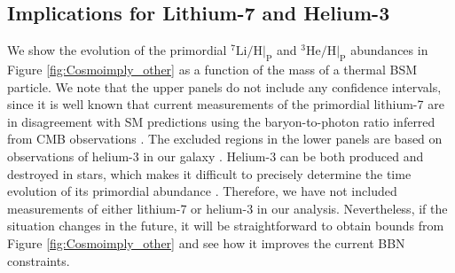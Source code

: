 \documentclass[notitlepage,letterpaper,natbib,aps,prd,onecolumn,amsmath,amsfonts,nofootinbib,preprintnumbers,superscriptaddress,secnumarabic,groupedaddress]{revtex4-1}
\begin{document}
\cleardoublepage

\cleardoublepage

\subsection{Implications for Lithium-7 and Helium-3}
\label{app:cosmo_imp_other}
We show the evolution of the primordial $^7\mathrm{Li}/\mathrm{H}|_\mathrm{P}$ and $^3\mathrm{He}/\mathrm{H}|_\mathrm{P}$ abundances in Figure \ref{fig:Cosmoimply_other} as a function of the mass of a thermal BSM particle. We note that the upper panels do not include any confidence intervals, since it is well known that current measurements of the primordial lithium-7 are in disagreement with SM predictions using the baryon-to-photon ratio inferred from CMB observations \cite{pdg}. The excluded regions in the lower panels are based on observations of helium-3 in our galaxy \cite{Bania:2002yj}. Helium-3 can be both produced and destroyed in stars, which makes it difficult to precisely determine the time evolution of its primordial abundance \cite{VangioniFlam:2002sa}. Therefore, we have not included measurements of either lithium-7 or helium-3 in our analysis. Nevertheless, if the situation changes in the future, it will be straightforward to obtain bounds from Figure \ref{fig:Cosmoimply_other} and see how it improves the current BBN constraints.
\end{document}
